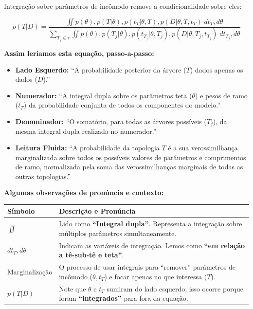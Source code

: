 Integração sobre parâmetros de incômodo remove a condicionalidade sobre eles:

$$p(T|D) = \frac{\iint p(\theta), p(T|\theta), p(t_T|\theta, T), p(D|\theta, T, t_T)\; dt_T, d\theta}{\sum_{T_j \in \tau} \iint p(\theta), p(T_j|\theta), p(t_{T_j}|\theta, T_j), p(D|\theta, T_j, t_{T_j})\; dt_{T_j}, d\theta}$$

\textbf{Assim leríamos esta equação, passo-a-passo:}

\begin{itemize}
    \item \textbf{Lado Esquerdo:} ``A probabilidade posterior da árvore ($T$) dados apenas os dados ($D$).''
    \item \textbf{Numerador:} ``A integral dupla sobre os parâmetros teta ($\theta$) e pesos de ramo ($t_T$) da probabilidade conjunta de todos os componentes do modelo.''
    \item \textbf{Denominador:} ``O somatório, para todas as árvores possíveis ($T_j$), da mesma integral dupla realizada no numerador.''
    \item \textbf{Leitura Fluida:} ``A probabilidade da topologia $T$ é a sua verossimilhança marginalizada sobre todos os possíveis valores de parâmetros e comprimentos de ramo, normalizada pela soma das verossimilhanças marginais de todas as outras topologias.''
\end{itemize}

\vspace{0.5cm}

\textbf{Algumas observações de pronúncia e contexto:}

\begin{center}
\renewcommand{\arraystretch}{1.5}
\begin{tabular}{lp{10cm}}
\hline
\textbf{Símbolo} & \textbf{Descrição e Pronúncia} \\ \hline
$\iint$ & Lido como \textbf{``Integral dupla''}. Representa a integração sobre múltiplos parâmetros simultaneamente. \\
$dt_T, d\theta$ & Indicam as variáveis de integração. Lemos como \textbf{``em relação a tê-sub-tê e teta''}. \\
Marginalização & O processo de usar integrais para ``remover'' parâmetros de incômodo ($\theta, t_T$) e focar apenas no que interessa ($T$). \\
$p(T|D)$ & Note que $\theta$ e $t_T$ sumiram do lado esquerdo; isso ocorre porque foram \textbf{``integrados''} para fora da equação. \\ \hline
\end{tabular}
\end{center}

